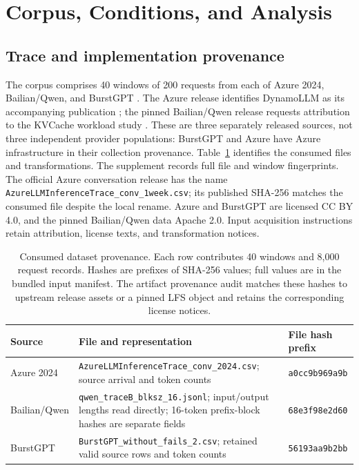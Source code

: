 \section{Corpus, Conditions, and Analysis}\label{sec:design}
\subsection{Trace and implementation provenance}
The corpus comprises 40 windows of 200 requests from each of Azure 2024,
Bailian/Qwen, and BurstGPT \citep{azure2024trace,bailianqwen2026,burstgpt2025}.
The Azure release identifies DynamoLLM as its accompanying publication
\citep{stojkovic2025dynamollm}; the pinned Bailian/Qwen release requests
attribution to the KVCache workload study \citep{wang2025kvcache}.
These are three separately released sources, not three independent provider
populations: BurstGPT and Azure have Azure infrastructure in their collection
provenance. Table~\ref{tab:provenance} identifies the consumed files and
transformations. The supplement records full file and window fingerprints.
The official Azure conversation release has the name
\texttt{AzureLLMInferenceTrace\_conv\_1week.csv}; its published SHA-256
matches the consumed file despite the local rename. Azure and BurstGPT
are licensed CC BY 4.0, and the pinned Bailian/Qwen data Apache 2.0.
Input acquisition instructions retain attribution, license texts, and
transformation notices.

\begin{table}[t]
\caption{Consumed dataset provenance. Each row contributes 40 windows and
8,000 request records. Hashes are prefixes of SHA-256 values; full values are
in the bundled input manifest. The artifact provenance audit matches these hashes to upstream release
assets or a pinned LFS object and retains the corresponding license notices.}
\label{tab:provenance}\small
\begin{tabularx}{\linewidth}{@{}lXl@{}}\toprule
Source & File and representation & File hash prefix \\\midrule
Azure 2024 & \texttt{AzureLLMInferenceTrace\_conv\_2024.csv}; source arrival and token counts & \texttt{a0cc9b969a9b} \\
Bailian/Qwen & \texttt{qwen\_traceB\_blksz\_16.jsonl}; input/output lengths read directly; 16-token prefix-block hashes are separate fields & \texttt{68e3f98e2d60} \\
BurstGPT & \texttt{BurstGPT\_without\_fails\_2.csv}; retained valid source rows and token counts & \texttt{56193aa9b2bb} \\\bottomrule
\end{tabularx}
\end{table}

